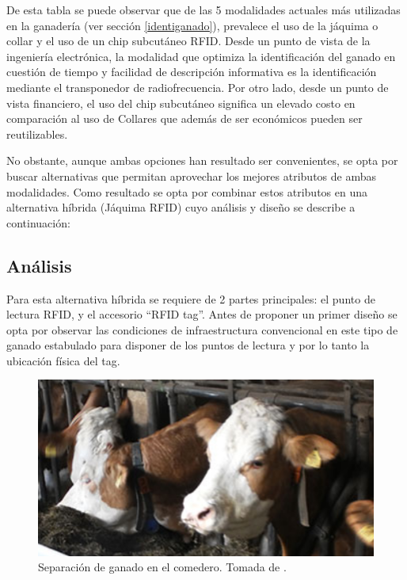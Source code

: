 	
	
	
De esta tabla se puede observar que de las 5 modalidades actuales más utilizadas en la ganadería (ver sección \ref{identiganado}), prevalece el uso de la jáquima o collar y el uso de un chip subcutáneo RFID.
Desde un punto de vista de la ingeniería electrónica, la modalidad que optimiza la identificación del ganado en cuestión de tiempo y facilidad de descripción informativa es la identificación mediante el transponedor de radiofrecuencia. Por otro lado, desde un punto de vista financiero, el uso del chip subcutáneo significa un elevado costo en comparación al uso de Collares que además de ser económicos  pueden ser reutilizables.

No obstante, aunque ambas opciones han resultado ser convenientes, se opta por buscar alternativas que permitan aprovechar los mejores atributos de ambas modalidades. Como resultado se opta por combinar estos atributos en una alternativa híbrida (Jáquima RFID) cuyo análisis y diseño se describe a continuación:

\subsection{Análisis}
 Para esta alternativa híbrida se requiere de 2 partes principales: el punto de lectura RFID, y el accesorio ``RFID tag''. Antes de proponer un primer diseño se opta por observar las condiciones de infraestructura convencional en este tipo de ganado estabulado para disponer de los puntos de lectura y por lo tanto la ubicación física del tag.
  
  \begin{figure}[H]
		\begin{center}
			\includegraphics[scale=0.75]{img/barras.png}
		\end{center}
		\caption{Separación de ganado en el comedero.  Tomada de \cite{googlepics}. \label{barraspng}}
	\end{figure}
  
